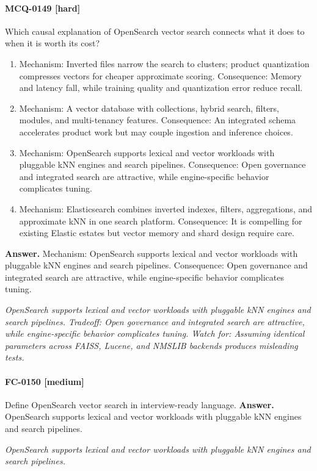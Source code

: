 \paragraph{MCQ-0149 [hard]} Which causal explanation of OpenSearch vector search connects what it does to when it is worth its cost?
\begin{enumerate}[label=\Alph*.]
\item Mechanism: Inverted files narrow the search to clusters; product quantization compresses vectors for cheaper approximate scoring. Consequence: Memory and latency fall, while training quality and quantization error reduce recall.
\item Mechanism: A vector database with collections, hybrid search, filters, modules, and multi-tenancy features. Consequence: An integrated schema accelerates product work but may couple ingestion and inference choices.
\item Mechanism: OpenSearch supports lexical and vector workloads with pluggable kNN engines and search pipelines. Consequence: Open governance and integrated search are attractive, while engine-specific behavior complicates tuning.
\item Mechanism: Elasticsearch combines inverted indexes, filters, aggregations, and approximate kNN in one search platform. Consequence: It is compelling for existing Elastic estates but vector memory and shard design require care.
\end{enumerate}
\noindent\textbf{Answer.} Mechanism: OpenSearch supports lexical and vector workloads with pluggable kNN engines and search pipelines. Consequence: Open governance and integrated search are attractive, while engine-specific behavior complicates tuning.
\par\textit{OpenSearch supports lexical and vector workloads with pluggable kNN engines and search pipelines. Tradeoff: Open governance and integrated search are attractive, while engine-specific behavior complicates tuning. Watch for: Assuming identical parameters across FAISS, Lucene, and NMSLIB backends produces misleading tests.}
\paragraph{FC-0150 [medium]} Define OpenSearch vector search in interview-ready language.
\noindent\textbf{Answer.} OpenSearch supports lexical and vector workloads with pluggable kNN engines and search pipelines.
\par\textit{OpenSearch supports lexical and vector workloads with pluggable kNN engines and search pipelines.}
